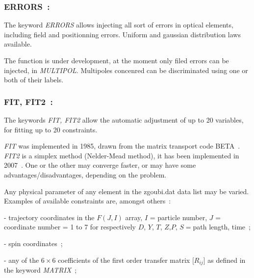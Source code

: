 \newpage

\subsubsection*{ERRORS~:  \ERRORSTitl}  \label{ERRORS}   
\medskip

 The keyword \textsl{ERRORS} allows injecting all sort of errors in optical elements, 
including field and positionning errors. Uniform and gaussian distribution laws available. 

\medskip 

 \noindent The function is under development, at the moment only filed errors can be injected, 
in \textsl{MULTIPOL}. Multipoles concenred can be discriminated using one or both of their 
labels.





\newpage

\subsubsection*{FIT, FIT2~:  \FITTitl}  \label{FIT}   
\medskip

 The keywords \textsl{FIT, FIT2} allow the automatic adjustment of up to 20 
variables, for fitting up to 20 constraints. 

\medskip 

 \noindent 
\textsl{FIT} was implemented in 1985, drawn from  the matrix transport code BETA~\cite{Biblio10}. 
\textsl{FIT2} is a simplex method (Nelder-Mead method), it has been implemented  in 2007~\cite{NelderMead}.   
One or the other may converge 
faster, or may have some advantages/disadvantages,  depending on the problem. 

\medskip 
\noindent Any physical parameter of any element in the zgoubi.dat data list may 
be varied. Examples of available constraints  are, amongst others~:  

\noindent -  trajectory coordinates in the  $ F(J,I) $ array, 
$ I $  =  particle number, $ J $  = coordinate number = 1 to 7 for 
respectively $ D$, $Y$, $T$, $Z$,$ P $, $ S= $path length, time~;

\noindent -  spin coordinates~;

\noindent - any of the $6 \times 6$
coefficients of the first order transfer matrix $ \lbrack R_{ij}\rbrack $ as defined in the
keyword \textsl{MATRIX}~; 


